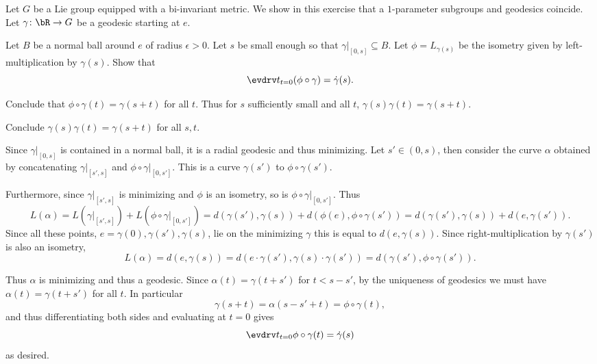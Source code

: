 \bprob

    Let $G$ be a Lie group equipped with a bi-invariant metric.
    We show in this exercise that a $1$-parameter subgroups and geodesics coincide.
    Let $\gamma\colon\bR\to G$ be a geodesic starting at $e$.
    \benum
        \item Let $B$ be a normal ball around $e$ of radius $\epsilon>0$.
        Let $s$ be small enough so that $\gamma|_{[0,s]}\subseteq B$.
        Let $\phi=L_{\gamma(s)}$ be the isometry given by left-multiplication by $\gamma(s)$.
        Show that
        $$ \evdrv t_{t=0}(\phi\circ\gamma) = \dot\gamma(s) . $$

        \item Conclude that $\phi\circ\gamma(t)=\gamma(s+t)$ for all $t$.
        Thus for $s$ sufficiently small and all $t$, $\gamma(s)\gamma(t)=\gamma(s+t)$.

        \item Conclude $\gamma(s)\gamma(t)=\gamma(s+t)$ for all $s,t$.
    \eenum

\eprob

\benum
    \item Since $\gamma|_{[0,s]}$ is contained in a normal ball, it is a radial geodesic and thus minimizing.
    Let $s'\in(0,s)$, then consider the curve $\alpha$ obtained by concatenating $\gamma|_{[s',s]}$ and $\phi\circ\gamma|_{[0,s']}$.
    This is a curve $\gamma(s')$ to $\phi\circ\gamma(s')$.

    Furthermore, since $\gamma|_{[s',s]}$ is minimizing and $\phi$ is an isometry, so is $\phi\circ\gamma|_{[0,s']}$.
    Thus
    $$ L(\alpha) = L(\gamma|_{[s',s]}) + L(\phi\circ\gamma|_{[0,s']}) = d(\gamma(s'),\gamma(s)) + d(\phi(e),\phi\circ\gamma(s')) =
    d(\gamma(s'),\gamma(s)) + d(e,\gamma(s')) . $$
    Since all these points, $e=\gamma(0),\gamma(s'),\gamma(s)$, lie on the minimizing $\gamma$ this is equal to $d(e,\gamma(s))$.
    Since right-multiplication by $\gamma(s')$ is also an isometry,
    $$ L(\alpha) = d(e,\gamma(s)) = d(e\cdot\gamma(s'),\gamma(s)\cdot\gamma(s')) = d(\gamma(s'),\phi\circ\gamma(s')) . $$

    Thus $\alpha$ is minimizing and thus a geodesic.
    Since $\alpha(t)=\gamma(t+s')$ for $t<s-s'$, by the uniqueness of geodesics we must have $\alpha(t)=\gamma(t+s')$ for all $t$.
    In particular
    $$ \gamma(s+t) = \alpha(s-s'+t) = \phi\circ\gamma(t) , $$
    and thus differentiating both sides and evaluating at $t=0$ gives
    $$ \evdrv t_{t=0}\phi\circ\gamma(t) = \dot\gamma(s) $$
    as desired.

